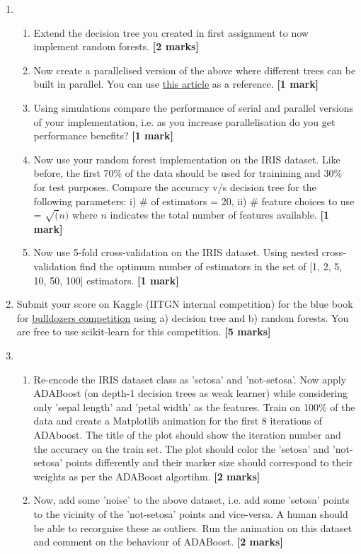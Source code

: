 \documentclass[colorlinks]{article}
\begin{document}
\begin{enumerate}



	 \item \begin{enumerate}
	 	\item Extend the decision tree you created in first assignment to now implement random forests.  \textbf{[2 marks]}
	 	\item Now create a parallelised version of the above where different trees can be built in parallel. You can use \href{https://sebastianraschka.com/Articles/2014_multiprocessing.html}{this article} as a reference. \textbf{[1 mark]}
	 	\item Using simulations compare the performance of serial and parallel versions of your implementation, i.e. as you increase parallelisation do you get performance benefits? \textbf{[1 mark]}
	 	\item Now use your random forest implementation on the IRIS dataset. Like before, the first 70\% of the data should be used for trainining and 30\% for test purposes. Compare the accuracy v/s decision tree for the following parameters: i) \# of estimators = 20, ii) \# feature choices to use = $\sqrt(n)$ where $n$ indicates the total number of features available.  \textbf{[1 mark]}
	 	\item Now use 5-fold cross-validation on the IRIS dataset. Using nested cross-validation find the optimum number of estimators in the set of [1, 2, 5, 10, 50, 100] estimators.  \textbf{[1 mark]}
	 \end{enumerate}
 
	\item Submit your score on Kaggle (IITGN internal competition) for the blue book for \href{https://www.kaggle.com/c/iitgnml/}{bulldozers competition} using a) decision tree and b) random forests. You are free to use scikit-learn for this competition. 
\textbf{[5 marks]}

\item \begin{enumerate}
	\item Re-encode the IRIS dataset class as 'setosa' and 'not-setosa'. Now apply ADABoost (on depth-1 decision trees as weak learner) while considering only 'sepal length' and 'petal width' as the features. Train on 100\% of the data and create a Matplotlib animation for the first 8 iterations of ADAboost. The title of the plot should show the iteration number and the accuracy on the train set. The plot should color the 'setosa' and 'not-setosa' points differently and their marker size should correspond to their weights as per the ADABoost algortihm. \textbf{[2 marks]}
	\item Now, add some 'noise' to the above dataset, i.e. add some 'setosa' points to the vicinity of the 'not-setosa' points and vice-versa. A human should be able to recorgnise these as outliers. Run the animation on this dataset and comment on the behaviour of ADABoost. \textbf{[2 marks]}
\end{enumerate}



\end{enumerate}
\end{document}
